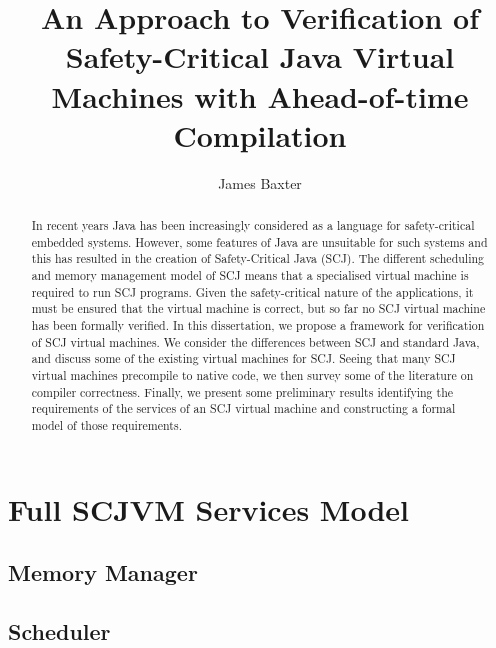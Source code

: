 \documentclass[a4paper,10pt]{report}
\title{An Approach to Verification of Safety-Critical Java Virtual
  Machines with Ahead-of-time Compilation}
\author{James Baxter}
\date{}
\newif\ifFullModel
\begin{document}
\maketitle

\begin{abstract}
  In recent years Java has been increasingly considered as a language
  for safety-critical embedded systems.
  However, some features of Java are unsuitable for such systems and
  this has resulted in the creation of Safety-Critical Java (SCJ).
  The different scheduling and memory management model of SCJ means
  that a specialised virtual machine is required to run SCJ programs.
  Given the safety-critical nature of the applications, it must be
  ensured that the virtual machine is correct, but so far no SCJ
  virtual machine has been formally verified.
  In this dissertation, we propose a framework for verification of SCJ
  virtual machines.
  We consider the differences between SCJ and standard Java, and
  discuss some of the existing virtual machines for SCJ.
  Seeing that many SCJ virtual machines precompile to native code, we
  then survey some of the literature on compiler correctness.
  Finally, we present some preliminary results identifying the
  requirements of the services of an SCJ virtual machine and
  constructing a formal model of those requirements.
\end{abstract}

\tableofcontents













{\raggedright \printbibliography}

\appendix

\chapter{Full SCJVM Services Model}
\label{full-scjvm-services-model}
\FullModeltrue

\section{Memory Manager}


\section{Scheduler}

\end{document}
